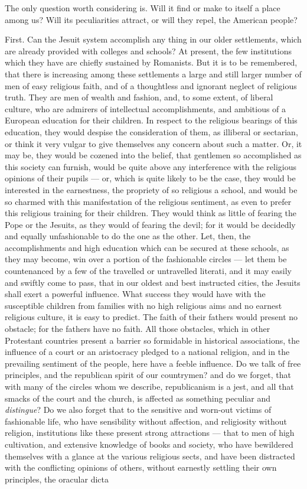 \documentclass[]{book}
\begin{document}
The only question worth considering is. Will it find or make to itself a place among us? Will its peculiarities attract, or will they repel, the American people?

First. Can the Jesuit system accomplish any thing in our older settlements, which are already provided with colleges and schools? At present, the few institutions which they have are chiefly sustained by Romanists. But it is to be remembered, that there is increasing among these settlements a large and still larger number of men of easy religious faith, and of a thoughtless and ignorant neglect of religious truth. They are men of wealth and fashion, and, to some extent, of liberal culture, who are admirers of intellectual accomplishments, and ambitious of a European education for their children. In respect to the religious bearings of this education, they would despise the consideration of them, as illiberal or sectarian, or think it very vulgar to give themselves any concern about such a matter. Or, it may be, they would be cozened into the belief, that gentlemen so accomplished as this society can furnish, would be quite above any interference with the religious opinions of their pupils --- or, which is quite likely to be the case, they would be interested in the earnestness, the propriety of so religious a school, and would be so charmed with this manifestation of the religious sentiment, as even to prefer this religious training for their children. They would think as little of fearing the Pope or the Jesuits, as they would of fearing the devil; for it would be decidedly and equally unfashionable to do the one as the other. Let, then, the accomplishments and high education which can be secured at these schools, as they may become, win over a portion of the fashionable circles --- let them be countenanced by a few of the travelled or untravelled literati, and it may easily and swiftly come to pass, that in our oldest and best instructed cities, the Jesuits shall exert a powerful influence. What success they would have with the susceptible children from families with no high religious aims and no earnest religious culture, it is easy to predict. The faith of their fathers would present no obstacle; for the fathers have no faith. All those obstacles, which in other Protestant countries present a barrier so formidable in historical associations, the influence of a court or an aristocracy pledged to a national religion, and in the prevailing sentiment of the people, here have a feeble influence. Do we talk of free principles, and the republican spirit of our countrymen? and do we forget, that with many of the circles whom we describe, republicanism is a jest, and all that smacks of the court and the church, is affected as something peculiar and \emph{distingue}? Do we also forget that to the sensitive and worn-out victims of fashionable life, who have sensibility without affection, and religiosity without religion, institutions like these present strong attractions --- that to men of high cultivation, and extensive knowledge of books and society, who have bewildered themselves with a glance at the various religious sects, and have been distracted with the conflicting opinions of others, without earnestly settling their own principles, the oracular dicta 
\end{document}
